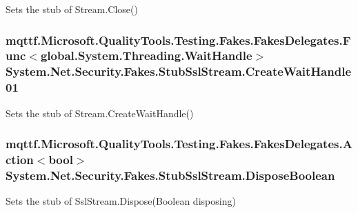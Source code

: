 Sets the stub of Stream.\-Close()

\hypertarget{class_system_1_1_net_1_1_security_1_1_fakes_1_1_stub_ssl_stream_ae8b21c82a3cc456d53405074a9c36401}{
\subsubsection[{Create\-Wait\-Handle01}]{\setlength{\rightskip}{0pt plus 5cm}mqttf.\-Microsoft.\-Quality\-Tools.\-Testing.\-Fakes.\-Fakes\-Delegates.\-Func$<$global.\-System.\-Threading.\-Wait\-Handle$>$ System.\-Net.\-Security.\-Fakes.\-Stub\-Ssl\-Stream.\-Create\-Wait\-Handle01}}\label{class_system_1_1_net_1_1_security_1_1_fakes_1_1_stub_ssl_stream_ae8b21c82a3cc456d53405074a9c36401}


Sets the stub of Stream.\-Create\-Wait\-Handle()

\hypertarget{class_system_1_1_net_1_1_security_1_1_fakes_1_1_stub_ssl_stream_a7f17859e8292238c0d0ddc8c57f39191}{
\subsubsection[{Dispose\-Boolean}]{\setlength{\rightskip}{0pt plus 5cm}mqttf.\-Microsoft.\-Quality\-Tools.\-Testing.\-Fakes.\-Fakes\-Delegates.\-Action$<$bool$>$ System.\-Net.\-Security.\-Fakes.\-Stub\-Ssl\-Stream.\-Dispose\-Boolean}}\label{class_system_1_1_net_1_1_security_1_1_fakes_1_1_stub_ssl_stream_a7f17859e8292238c0d0ddc8c57f39191}


Sets the stub of Ssl\-Stream.\-Dispose(\-Boolean disposing)

